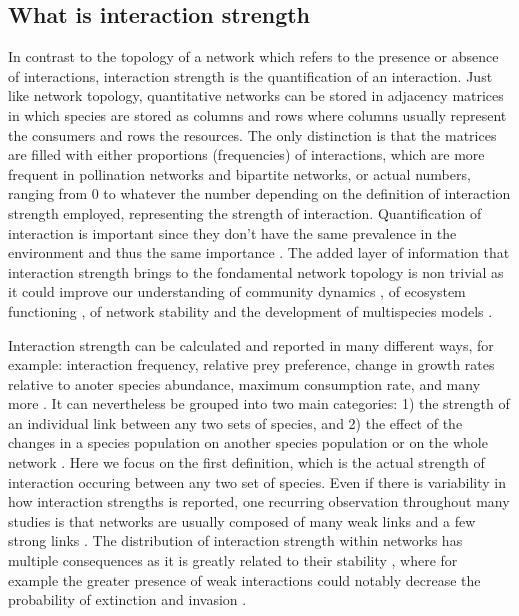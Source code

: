 \documentclass[english,12pt]{article}
\begin{document}
\subsection{What is interaction strength}
In contrast to the topology of a network which refers to the presence or absence of interactions, interaction strength is the quantification of an interaction. Just like network topology, quantitative networks can be stored in adjacency matrices in which species are stored as columns and rows \citep{Delmas2019AnaEco,Wells2013SpeInt,Pascual2005EcoNet} where columns usually represent the consumers and rows the resources. The only distinction is that the matrices are filled with either proportions (frequencies) of interactions, which are more frequent in pollination networks and bipartite networks, or actual numbers, ranging from 0 to whatever the number depending on the definition of interaction strength employed, representing the strength of interaction. Quantification of interaction is important since they don't have the same prevalence in the environment and thus the same importance \citep{Paine1980FooWeb,Benke1997TroBas}. The added layer of information that interaction strength brings to the fondamental network topology is non trivial as it could improve our understanding of community dynamics \citep{Paine1992FooAna,Laska1998TheConb}, of ecosystem functioning \citep{Montoya2003FooWeb}, of network stability \citep{Neutel2002StaRea,deRuiter1995EnePat} and the development of multispecies models \citep{Wootton2005MeaInt}.\

Interaction strength can be calculated and reported in many different ways, for example: interaction frequency, relative prey preference, change in growth rates relative to anoter species abundance, maximum consumption rate, and many more \citep{Berlow2004IntStr,Laska1998TheConb,Wootton2005MeaInt}. It can nevertheless be grouped into two main categories: 1) the strength of an individual link between any two sets of species, and 2) the effect of the changes in a species population on another species population or on the whole network \citep{Berlow2004IntStr}. Here we focus on the first definition, which is the actual strength of interaction occuring between any two set of species. Even if there is variability in how interaction strengths is reported, one recurring observation throughout many studies is that networks are usually composed of many weak links and a few strong links \citep{Berlow2004IntStr,McCann1998WeaTro}. The distribution of interaction strength within networks has multiple consequences as it is greatly related to their stability \citep{Brose2008ForThe}, where for example the greater presence of weak interactions could notably decrease the probability of extinction and invasion \citep{Sala2002ComDisa,McCann1998WeaTro}.\
\end{document}
